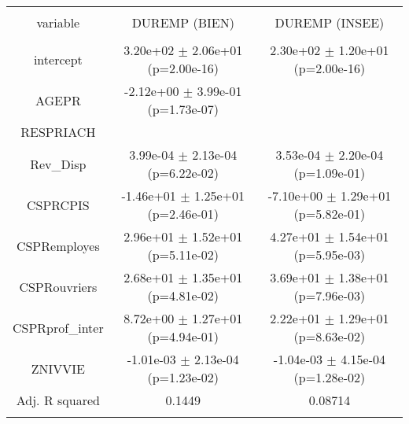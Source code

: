 \documentclass{article}
\begin{document}
\begin{table}[!htbp] \centering 
  \caption{} 
  \label{} 
\begin{tabular}{@{\extracolsep{5pt}} ccc} 
\\[-1.8ex]\hline 
\hline \\[-1.8ex] 
variable & DUREMP (BIEN) & DUREMP (INSEE) \\ 
\hline \\[-1.8ex] 
intercept &  3.20e+02 $\pm$ 2.06e+01 (p=2.00e-16) &  2.30e+02 $\pm$ 1.20e+01 (p=2.00e-16) \\ 
AGEPR & -2.12e+00 $\pm$ 3.99e-01 (p=1.73e-07) &  \\ 
RESPRIACH &  &  \\ 
Rev\_Disp &  3.99e-04 $\pm$ 2.13e-04 (p=6.22e-02) &  3.53e-04 $\pm$ 2.20e-04 (p=1.09e-01) \\ 
CSPRCPIS & -1.46e+01 $\pm$ 1.25e+01 (p=2.46e-01) & -7.10e+00 $\pm$ 1.29e+01 (p=5.82e-01) \\ 
CSPRemployes &  2.96e+01 $\pm$ 1.52e+01 (p=5.11e-02) &  4.27e+01 $\pm$ 1.54e+01 (p=5.95e-03) \\ 
CSPRouvriers &  2.68e+01 $\pm$ 1.35e+01 (p=4.81e-02) &  3.69e+01 $\pm$ 1.38e+01 (p=7.96e-03) \\ 
CSPRprof\_inter &  8.72e+00 $\pm$ 1.27e+01 (p=4.94e-01) &  2.22e+01 $\pm$ 1.29e+01 (p=8.63e-02) \\ 
ZNIVVIE & -1.01e-03 $\pm$ 2.13e-04 (p=1.23e-02) & -1.04e-03 $\pm$ 4.15e-04 (p=1.28e-02) \\ 
Adj. R squared & 0.1449 & 0.08714 \\ 
\hline \\[-1.8ex] 
\end{tabular} 
\end{table} 
\end{document}
